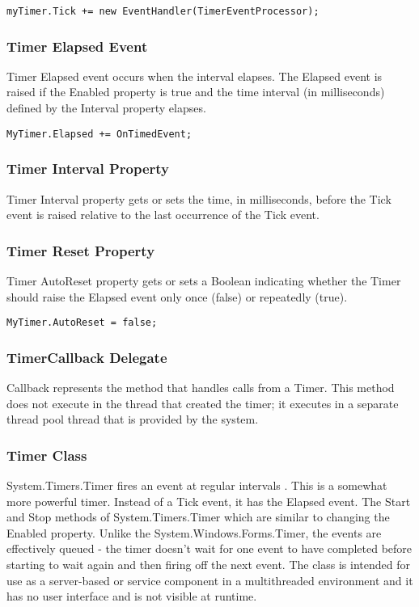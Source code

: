 \begin{lstlisting}[numbers=none]
myTimer.Tick += new EventHandler(TimerEventProcessor);
\end{lstlisting}

\subsubsection*{Timer Elapsed Event}
Timer Elapsed event occurs when the interval elapses. The Elapsed event is raised if the Enabled property is true and the time interval (in milliseconds) defined by the Interval property elapses.

\begin{lstlisting}[numbers=none]
MyTimer.Elapsed += OnTimedEvent;
\end{lstlisting}

\subsubsection*{Timer Interval Property}
Timer Interval property gets or sets the time, in milliseconds, before the Tick event is raised relative to the last occurrence of the Tick event.


\subsubsection*{Timer Reset Property}
Timer AutoReset property gets or sets a Boolean indicating whether the Timer should raise the Elapsed event only once (false) or repeatedly (true).

\begin{lstlisting}[numbers=none]
MyTimer.AutoReset = false;
\end{lstlisting}


\subsubsection*{TimerCallback Delegate}
Callback represents the method that handles calls from a Timer. This method does not execute in the thread that created the timer; it executes in a separate thread pool thread that is provided by the system.

\subsubsection*{Timer Class}
System.Timers.Timer fires an event at regular intervals . This is a somewhat more powerful timer. Instead of a Tick event, it has the Elapsed event. The Start and Stop methods of System.Timers.Timer which are similar to changing the Enabled property. Unlike the System.Windows.Forms.Timer, the events are effectively queued - the timer doesn't wait for one event to have completed before starting to wait again and then firing off the next event. The class is intended for use as a server-based or service component in a multithreaded environment and it has no user interface and is not visible at runtime.

